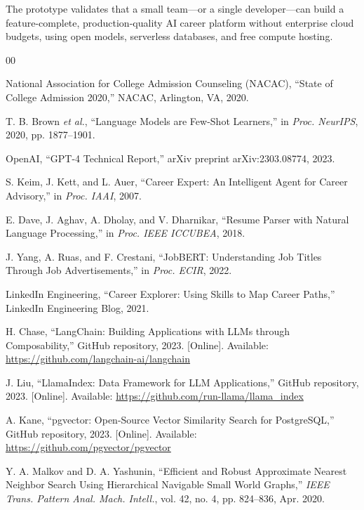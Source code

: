 \documentclass[conference]{IEEEtran}
\begin{document}
The prototype validates that a small team---or a single developer---can build
a feature-complete, production-quality AI career platform without enterprise
cloud budgets, using open models, serverless databases, and free compute
hosting.

\begin{thebibliography}{00}

National Association for College Admission Counseling (NACAC),
``State of College Admission 2020,''
NACAC, Arlington, VA, 2020.

T. B. Brown \textit{et al.},
``Language Models are Few-Shot Learners,''
in \textit{Proc. NeurIPS}, 2020, pp. 1877--1901.

OpenAI,
``GPT-4 Technical Report,''
arXiv preprint arXiv:2303.08774, 2023.

S. Keim, J. Kett, and L. Auer,
``Career Expert: An Intelligent Agent for Career Advisory,''
in \textit{Proc. IAAI}, 2007.

E. Dave, J. Aghav, A. Dholay, and V. Dharnikar,
``Resume Parser with Natural Language Processing,''
in \textit{Proc. IEEE ICCUBEA}, 2018.

J. Yang, A. Ruas, and F. Crestani,
``JobBERT: Understanding Job Titles Through Job Advertisements,''
in \textit{Proc. ECIR}, 2022.

LinkedIn Engineering,
``Career Explorer: Using Skills to Map Career Paths,''
LinkedIn Engineering Blog, 2021.

H. Chase,
``LangChain: Building Applications with LLMs through Composability,''
GitHub repository, 2023. [Online]. Available: \url{https://github.com/langchain-ai/langchain}

J. Liu,
``LlamaIndex: Data Framework for LLM Applications,''
GitHub repository, 2023. [Online]. Available: \url{https://github.com/run-llama/llama_index}

A. Kane,
``pgvector: Open-Source Vector Similarity Search for PostgreSQL,''
GitHub repository, 2023. [Online]. Available: \url{https://github.com/pgvector/pgvector}

Y. A. Malkov and D. A. Yashunin,
``Efficient and Robust Approximate Nearest Neighbor Search Using Hierarchical Navigable Small World Graphs,''
\textit{IEEE Trans. Pattern Anal. Mach. Intell.}, vol. 42, no. 4, pp. 824--836, Apr. 2020.


\end{thebibliography}
\end{document}
